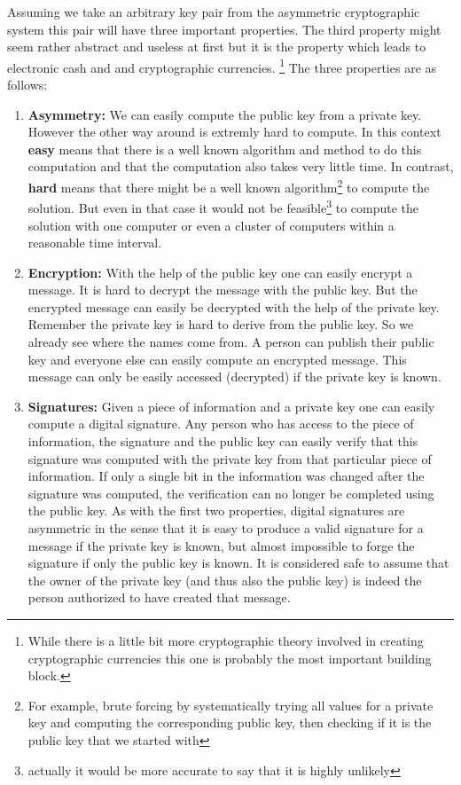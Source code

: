 \documentclass[a4paper,12pt,oneside,openany]{book}
\begin{document}
Assuming we take an arbitrary key pair from the asymmetric cryptographic system this pair will have three important properties.
The third property might seem rather abstract and useless at first but it is the property which leads to electronic cash and and cryptographic currencies. \footnote{While there is a little bit more cryptographic theory involved in creating cryptographic currencies this one is probably the most important building block.}
The three properties are as follows:
\begin{enumerate}
\item \textbf{Asymmetry:} We can easily compute the public key from a private key.
However the other way around is extremly hard to compute.
In this context \textbf{\gls{easy}} means that there is a well known algorithm and method to do this computation and that the computation also takes very little time.
In contrast, \textbf{\gls{hard}} means that there might be a well known algorithm\footnote{For example, brute forcing by systematically trying all values for a private key and computing the corresponding public key, then checking if it is the public key that we started with} to compute the solution.
But even in that case it would not be feasible\footnote{actually it would be more accurate to say that it is highly  unlikely} to compute the solution with one computer or even a cluster of computers within a reasonable time interval.
\item \textbf{Encryption:} With the help of the public key one can easily encrypt a message.
It is hard to decrypt the message with the public key.
But the encrypted message can easily be decrypted with the help of the private key.
Remember the private key is hard to derive from the public key.
So we already see where the names come from.
A person can publish their public key and everyone else can easily compute an encrypted message.
This message can only be easily accessed (decrypted) if the private key is known.
\item \textbf{Signatures:} Given a piece of information and a private key one can easily compute a digital signature.
  Any person who has access to the piece of information, the signature and the public key can easily verify that this signature was computed with the private key from that particular piece of information.
  If only a single bit in the information was changed after the signature was computed, the verification can no longer be completed using the public key.
  As with the first two properties, digital signatures are asymmetric in the sense that it is easy to produce a valid signature for a message if the private key is known, but almost impossible to forge the signature if only the public key is known.
  It is considered safe to assume that the owner of the private key (and thus also the public key) is indeed the person authorized to have created that message.
\end{enumerate}
\end{document}
